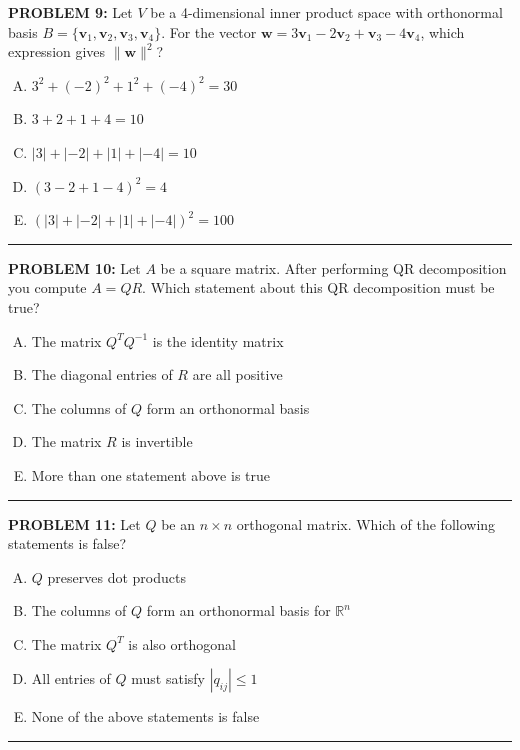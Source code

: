 \documentclass[12pt]{amsart}
\newcommand{\divider}{
  \vspace{-1em} %
  \noindent
  \raisebox{-0.15ex}{\textbullet}%
  \hspace{0.5em}%
  \rule[0.5ex]{0.95\textwidth}{1.0pt}%
  \hspace{0.5em}%
  \raisebox{-0.15ex}{\textbullet}%
  \vspace{0em} %
}
\begin{document}
{\bf PROBLEM 9:}
Let $V$ be a 4-dimensional inner product space with orthonormal basis $B = \{\mathbf{v}_1, \mathbf{v}_2, \mathbf{v}_3, \mathbf{v}_4\}$. 
For the vector $\mathbf{w} = 3\mathbf{v}_1 - 2\mathbf{v}_2 + \mathbf{v}_3 - 4\mathbf{v}_4$, which expression gives $\|\mathbf{w}\|^2$?

\begin{enumerate}[(A)]
\item $3^2 + (-2)^2 + 1^2 + (-4)^2 = 30$
\item $3 + 2 + 1 + 4 = 10$
\item $|3| + |-2| + |1| + |-4| = 10$
\item $(3 - 2 + 1 - 4)^2 = 4$
\item $(|3| + |-2| + |1| + |-4|)^2 = 100$
\end{enumerate}
%
%
\divider 



{\bf PROBLEM 10:}
Let $A$ be a square matrix. After performing QR decomposition you compute $A = QR$.
Which statement about this QR decomposition must be true?
%
\begin{enumerate}[(A)]
\item The matrix $Q^TQ^{-1}$ is the identity matrix 
\item The diagonal entries of $R$ are all positive
\item The columns of $Q$ form an orthonormal basis
\item The matrix $R$ is invertible
\item More than one statement above is true
\end{enumerate}
%
%
\divider


{\bf PROBLEM 11:}
Let $Q$ be an $n \times n$ orthogonal matrix. Which of the following statements is false?
%
\begin{enumerate}[(A)]
\item $Q$ preserves dot products
\item The columns of $Q$ form an orthonormal basis for $\mathbb{R}^n$
\item The matrix $Q^T$ is also orthogonal
\item All entries of $Q$ must satisfy $|q_{ij}| \leq 1$
\item None of the above statements is false
\end{enumerate}
%
%
\divider
\end{document}
